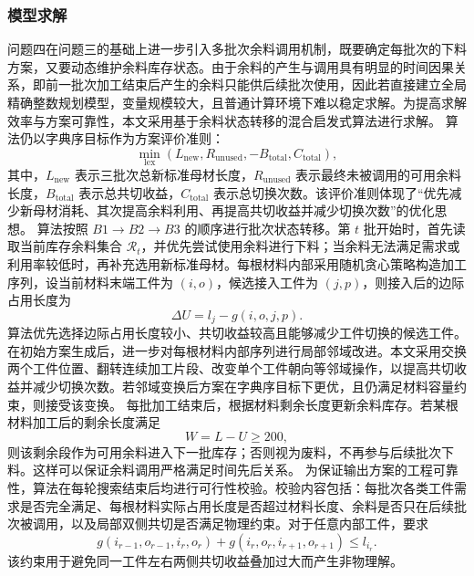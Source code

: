 \documentclass[UTF8]{ctexart}
\begin{document}
\subsubsection{模型求解}
问题四在问题三的基础上进一步引入多批次余料调用机制，既要确定每批次的下料方案，又要动态维护余料库存状态。由于余料的产生与调用具有明显的时间因果关系，即前一批次加工结束后产生的余料只能供后续批次使用，因此若直接建立全局精确整数规划模型，变量规模较大，且普通计算环境下难以稳定求解。为提高求解效率与方案可靠性，本文采用基于余料状态转移的混合启发式算法进行求解。
算法仍以字典序目标作为方案评价准则：
\begin{equation}
\min_{\mathrm{lex}}
\left(
L_{\mathrm{new}},
R_{\mathrm{unused}},
-B_{\mathrm{total}},
C_{\mathrm{total}}
\right),
\end{equation}
其中，$L_{\mathrm{new}}$ 表示三批次总新标准母材长度，$R_{\mathrm{unused}}$ 表示最终未被调用的可用余料长度，$B_{\mathrm{total}}$ 表示总共切收益，$C_{\mathrm{total}}$ 表示总切换次数。该评价准则体现了“优先减少新母材消耗、其次提高余料利用、再提高共切收益并减少切换次数”的优化思想。
算法按照 $B1\rightarrow B2\rightarrow B3$ 的顺序进行批次状态转移。第 $t$ 批开始时，首先读取当前库存余料集合 $\mathcal R_t$，并优先尝试使用余料进行下料；当余料无法满足需求或利用率较低时，再补充选用新标准母材。每根材料内部采用随机贪心策略构造加工序列，设当前材料末端工件为 $(i,o)$，候选接入工件为 $(j,p)$，则接入后的边际占用长度为
\begin{equation}
\Delta U=l_j-g(i,o,j,p).
\end{equation}
算法优先选择边际占用长度较小、共切收益较高且能够减少工件切换的候选工件。
在初始方案生成后，进一步对每根材料内部序列进行局部邻域改进。本文采用交换两个工件位置、翻转连续加工片段、改变单个工件朝向等邻域操作，以提高共切收益并减少切换次数。若邻域变换后方案在字典序目标下更优，且仍满足材料容量约束，则接受该变换。
每批加工结束后，根据材料剩余长度更新余料库存。若某根材料加工后的剩余长度满足
\begin{equation}
W=L-U\geq 200,
\end{equation}
则该剩余段作为可用余料进入下一批库存；否则视为废料，不再参与后续批次下料。这样可以保证余料调用严格满足时间先后关系。
为保证输出方案的工程可靠性，算法在每轮搜索结束后均进行可行性校验。校验内容包括：每批次各类工件需求是否完全满足、每根材料实际占用长度是否超过材料长度、余料是否只在后续批次被调用，以及局部双侧共切是否满足物理约束。对于任意内部工件，要求
\begin{equation}
g(i_{r-1},o_{r-1},i_r,o_r)
+
g(i_r,o_r,i_{r+1},o_{r+1})
\leq l_{i_r}.
\end{equation}
该约束用于避免同一工件左右两侧共切收益叠加过大而产生非物理解。
\end{document}
